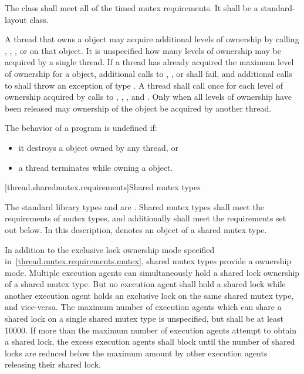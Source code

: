 \pnum
The class  shall meet all of the timed mutex
requirements. It shall be a standard-layout
class.

\pnum
A thread that owns a  object may acquire additional
levels of ownership by calling , ,
, or  on that object. It is
unspecified how many levels of ownership may be acquired by a single thread. If
a thread has already acquired the maximum level of ownership for a
 object, additional calls to ,
, or  shall fail, and additional
calls to  shall throw an exception of type . A
thread shall call  once for each level of ownership acquired by
calls to , , , and
. Only when all levels of ownership have been released
may ownership of the object be acquired by another thread.

\pnum
The behavior of a program is undefined if:

\begin{itemize}
\item it destroys a  object owned by any thread, or
\item a thread terminates while owning a  object.
\end{itemize}


[thread.sharedmutex.requirements]{Shared mutex types}

\pnum
The standard library types  and 
are . Shared mutex types shall meet the requirements of
mutex types, and additionally
shall meet the requirements set out below. In this description,
 denotes an object of a shared mutex type.

\pnum
In addition to the exclusive lock ownership mode specified
in~\ref{thread.mutex.requirements.mutex}, shared mutex types provide a
 ownership mode. Multiple execution agents can
simultaneously hold a shared lock ownership of a shared mutex type. But no
execution agent shall hold a shared lock while another execution agent holds an
exclusive lock on the same shared mutex type, and vice-versa. The maximum
number of execution agents which can share a shared lock on a single shared
mutex type is unspecified, but shall be at least 10000. If more than the
maximum number of execution agents attempt to obtain a shared lock, the
excess execution agents shall block until the number of shared locks are
reduced below the maximum amount by other execution agents releasing their
shared lock.

